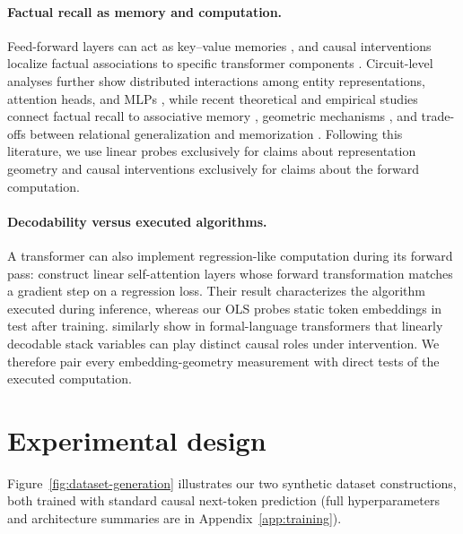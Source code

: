 \documentclass[11pt]{article}
\begin{document}
\paragraph{Factual recall as memory and computation.}
Feed-forward layers can act as key--value memories \citep{geva2021keyvalue}, and
causal interventions localize factual associations to specific transformer
components \citep{meng2022locating,geva2023dissecting}. Circuit-level analyses
further show distributed interactions among entity representations, attention
heads, and MLPs \citep{nanda2023factfinding}, while recent theoretical and
empirical studies connect factual recall to associative memory
\citep{nichani2024associative}, geometric mechanisms
\citep{ravfogel2026geometric}, and trade-offs between relational generalization
and memorization \citep{cheng2026balancing}. Following this literature, we use
linear probes exclusively for claims about representation geometry and causal
interventions exclusively for claims about the forward computation.

\paragraph{Decodability versus executed algorithms.}
A transformer can also implement regression-like computation during its forward
pass: \citet{vonoswald2023transformers} construct linear self-attention layers
whose forward transformation matches a gradient step on a regression loss.
Their result characterizes the algorithm executed during inference, whereas our
OLS probes static token embeddings in test after training.
\citet{sharma2026dissociating} similarly show in formal-language transformers
that linearly decodable stack variables can play distinct causal roles under
intervention. We therefore pair every embedding-geometry measurement with direct
tests of the executed computation.



\section{Experimental design}
\label{sec:design}

Figure~\ref{fig:dataset-generation} illustrates our two synthetic dataset
constructions, both trained with standard causal next-token prediction
(full hyperparameters and architecture summaries are in
Appendix~\ref{app:training}).
\end{document}
